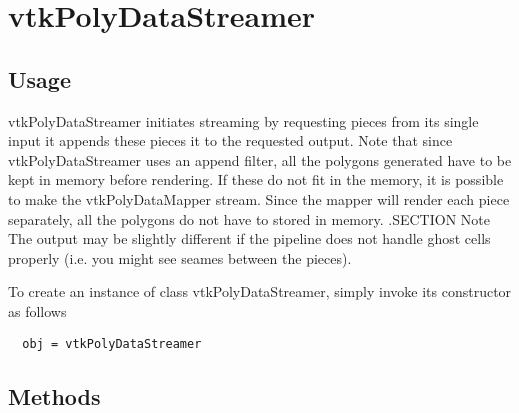 \section{vtkPolyDataStreamer}

\subsection{Usage}

 vtkPolyDataStreamer initiates streaming by requesting pieces from its 
 single input it appends these pieces it to the requested output.
 Note that since vtkPolyDataStreamer uses an append filter, all the
 polygons generated have to be kept in memory before rendering. If
 these do not fit in the memory, it is possible to make the vtkPolyDataMapper
 stream. Since the mapper will render each piece separately, all the
 polygons do not have to stored in memory.
 .SECTION Note
 The output may be slightly different if the pipeline does not handle 
 ghost cells properly (i.e. you might see seames between the pieces).

To create an instance of class vtkPolyDataStreamer, simply
invoke its constructor as follows
\begin{verbatim}
  obj = vtkPolyDataStreamer
\end{verbatim}
\subsection{Methods}

